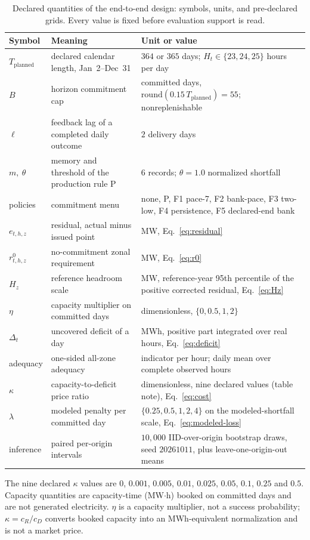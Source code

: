 \begin{table}[!tbp]
\centering
\caption{Declared quantities of the end-to-end design: symbols, units, and
pre-declared grids. Every value is fixed before evaluation support is read.}
\label{tab:r2-params}
\footnotesize
\setlength{\tabcolsep}{4pt}
\begin{tabular}{@{}l p{} p{}@{}}
\toprule
Symbol & Meaning & Unit or value \\
\midrule
$T_{\mathrm{planned}}$ & declared calendar length, Jan~2--Dec~31 &
  $364$ or $365$ days; $H_t\in\{23,24,25\}$ hours per day \\
$B$ & horizon commitment cap & committed days,
  $\mathrm{round}(0.15\,T_{\mathrm{planned}})=55$; nonreplenishable \\
$\ell$ & feedback lag of a completed daily outcome & $2$ delivery days \\
$m,\ \theta$ & memory and threshold of the production rule P &
  $6$ records; $\theta=1.0$ normalized shortfall \\
policies & commitment menu & none, P, F1 pace-7, F2 bank-pace,
  F3 two-low, F4 persistence, F5 declared-end bank \\
$e_{t,h,z}$ & residual, actual minus issued point & MW, Eq.~\eqref{eq:residual} \\
$r^{0}_{t,h,z}$ & no-commitment zonal requirement & MW, Eq.~\eqref{eq:r0} \\
$H_z$ & reference headroom scale & MW, reference-year 95th percentile of the
  positive corrected residual, Eq.~\eqref{eq:Hz} \\
$\eta$ & capacity multiplier on committed days & dimensionless,
  $\{0,0.5,1,2\}$ \\
$\Delta_t$ & uncovered deficit of a day & MWh, positive part integrated over
  real hours, Eq.~\eqref{eq:deficit} \\
adequacy & one-sided all-zone adequacy & indicator per hour; daily mean over
  complete observed hours \\
$\kappa$ & capacity-to-deficit price ratio & dimensionless, nine declared
  values (table note), Eq.~\eqref{eq:cost} \\
$\lambda$ & modeled penalty per committed day & $\{0.25,0.5,1,2,4\}$ on the
  modeled-shortfall scale, Eq.~\eqref{eq:modeled-loss} \\
inference & paired per-origin intervals & $10{,}000$ IID-over-origin
  bootstrap draws, seed $20261011$, plus leave-one-origin-out means \\
\bottomrule
\end{tabular}
\par\footnotesize The nine declared $\kappa$ values are $0$, $0.001$, $0.005$,
$0.01$, $0.025$, $0.05$, $0.1$, $0.25$ and $0.5$. Capacity quantities are
capacity-time (MW$\cdot$h) booked on committed days and are not generated
electricity. $\eta$ is a capacity multiplier, not a success probability;
$\kappa=c_R/c_D$ converts booked capacity into an MWh-equivalent normalization
and is not a market price.
\end{table}
